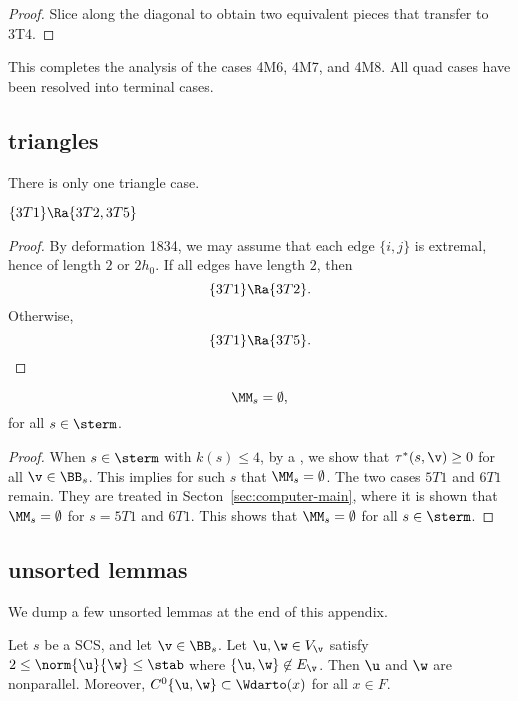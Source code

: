 \begin{proof} 
Slice along the diagonal to obtain two equivalent pieces that transfer to 3T4.
\end{proof}


This completes the analysis of the cases 4M6, 4M7, and 4M8.  
All quad cases have been resolved into terminal cases.



\subsection{triangles}


There is only one triangle case.

\begin{lemma}[]
$\{3T1\}\Ra \{3T2,3T5\}$
\end{lemma}

\begin{proof} By deformation 1834,  we may assume that each edge $\{i,j\}$ is extremal, hence
of length $2$ or $2h_0$.  If all edges have length $2$, then
\[
\{3T1\}\Ra\{3T2\}.
\]
Otherwise,
\[
\{3T1\}\Ra\{3T5\}.
\]
\end{proof}

\begin{lemma}\label{lemma:sterm-empty}
\[
\MM_s=\emptyset,
\]
for all $s\in\sterm$.
\end{lemma}

\begin{proof}
When $s\in \sterm$
with $k(s)\le 4$, by a , we show
that $\tau^*(s,\v) \ge0$ for all $\v\in \BB_s$.  This implies for such $s$
that $\MM_s=\emptyset$.  The two cases $5T1$ and $6T1$ remain.
They are treated in Secton~\ref{sec:computer-main}, where it is shown
that $\MM_s=\emptyset$ for $ s=5T1$ and $6T1$.  This
shows that $\MM_s=\emptyset$ for all $s\in \sterm$.
\end{proof}

\subsection{unsorted lemmas}

We dump a few unsorted lemmas at the end of this appendix.

\begin{lemma}[]\label{lemma:2hm-slice1}
Let $s$ be a SCS, and let $\v\in \BB_s$.
Let $\u,\w\in V_\v$ satisfy $2\le\norm{\u}{\w}\le \stab$ where
$\{\u,\w\}\not\in E_\v$.  Then $\u$ and $\w$ are nonparallel.
Moreover,
$C^0\{\u,\w\}\subset \Wdarto(x)$ for all $x\in F$.
\end{lemma}


